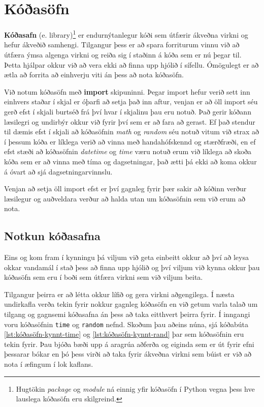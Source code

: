 
\chapter{Kóðasöfn}\label{k:import}
\textbf{Kóðasafn} (e. library)\footnote{Hugtökin \textit{package} og \textit{module} ná einnig yfir kóðasöfn í Python vegna þess hve lauslega kóðasöfn eru skilgreind.} er endurnýtanlegur kóði sem útfærir ákveðna virkni og hefur ákveðið samhengi.
Tilgangur þess er að spara forriturum vinnu við að útfæra ýmsa algenga virkni og reiða sig í staðinn á kóða sem er nú þegar til.
Þetta hjálpar okkur við að vera ekki að finna upp hjólið í sífellu.
Ómögulegt er að ætla að forrita að einhverju viti án þess að nota kóðasöfn.

Við notum kóðasöfn með \textbf{import} skipuninni. 
Þegar import hefur verið sett inn einhvers staðar í skjal er óþarfi að setja það inn aftur, venjan er að öll import séu gerð efst í skjali burtséð frá því hvar í skjalinu þau eru notuð.
Það gerir kóðann læsilegri og undirbýr okkur við fyrir því sem er að fara að gerast.
Ef það stendur til dæmis efst í skjali að kóðasöfnin \textit{math} og \textit{random} séu notuð vitum við strax að í þessum kóða er líklega verið að vinna með handahófskennd og stærðfræði, en ef efst stæði að kóðasöfnin \textit{datetime} og \textit{time} væru notuð erum við líklega að skoða kóða sem er að vinna með tíma og dagsetningar, það ætti þá ekki að koma okkur á óvart að sjá dagsetningarvinnslu.

Venjan að setja öll import efst er því gagnleg fyrir þær sakir að kóðinn verður læsilegur og auðveldara verður að halda utan um kóðasöfnin sem við erum að nota.

\section{Notkun kóðasafna}\label{uk:kóðasöfn-kynnt}
Eins og kom fram í kynningu þá viljum við geta einbeitt okkur að því að leysa okkar vandamál í stað þess að finna upp hjólið og því viljum við kynna okkur þau kóðasöfn sem eru í boði sem útfæra virkni sem við viljum beita.

Tilgangur þeirra er að létta okkur lífið og gera virkni aðgengilega.
Í næsta undirkafla verða tekin fyrir nokkur gagnleg kóðasöfn en við getum varla talað um tilgang og gagnsemi kóðasafna án þess að taka eitthvert þeirra fyrir.
Í inngangi voru kóðasöfnin \texttt{time} og \texttt{random} nefnd.
Skoðum þau aðeins núna, sjá kóðabúta \ref{lst:kóðasöfn-kynnt-time} og \ref{lst:kóðasöfn-kynnt-rand} þar sem kóðasöfnin eru tekin fyrir.
Þau bjóða bæði upp á aragrúa aðferða og eiginda sem er út fyrir efni þessarar bókar en þó þess virði að taka fyrir ákveðna virkni sem búist er við að nota í æfingum í lok kaflans.
